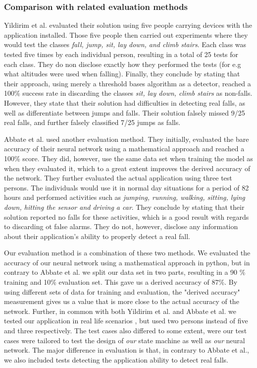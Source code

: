 \documentclass[12pt, a4paper, onecolumn]{article}
\begin{document}
\subsubsection{Comparison with related evaluation methods}
Yildirim et al. evaluated their solution using five people carrying devices with the application installed. Those five people then carried out experiments where they would test the classes \textit{fall, jump, sit, lay down, and climb stairs}. Each class was tested five times by each individual person, resulting in a total of 25 tests for each class. They do non disclose exactly how they performed the tests (for e.g what altitudes were used when falling). Finally, they conclude by stating that their approach, using merely a threshold bases algorithm as a detector, reached a 100\% success rate in discarding the classes \textit{sit, lay down, climb stairs} as non-falls. However, they state that their solution had difficulties in detecting real falls, as well as differentiate between jumps and falls. Their solution falsely missed 9/25 real falls, and further falsely classified 7/25 jumps as falls. 


Abbate et al. used another evaluation method. They initially, evaluated the bare accuracy of their neural network using a mathematical approach and reached a 100\% score. They did, however, use the same data set when training the model as when they evaluated it, which to a great extent improves the derived accuracy of the network. They further evaluated the actual application using three test persons. The individuals would use it in normal day situations for a period of 82 hours and performed activities such as \textit{jumping, running, walking, sitting, lying down, hitting the sensor and driving a car}. They conclude by stating that their solution reported no falls for these activities, which is a good result with regards to discarding ot false alarms. They do not, however, disclose any information about their application's ability to properly detect a real fall.


Our evaluation method is a combination of these two methods. We evaluated the accuracy of our neural network using a mathematical approach in python, but in contrary to Abbate et al. we split our data set in two parts, resulting in a 90 \% training and 10\%  evaluation set. This gave us a derived accuracy of 87\%. By using different sets of data for training and evaluation, the "derived accuracy" measurement gives us a value that is more close to the actual accuracy of the network. Further, in common with both Yildirim et al. and Abbate et al. we tested our application in real life scenarios , but used two persons instead of five and three respectively. The test cases also differed to some extent, were our test cases were tailored to test the design of \textit{our} state machine as well as \textit{our} neural network. The major difference in evaluation is that, in contrary to Abbate et al., we also included tests detecting the application ability to detect real falls. 
\end{document}
